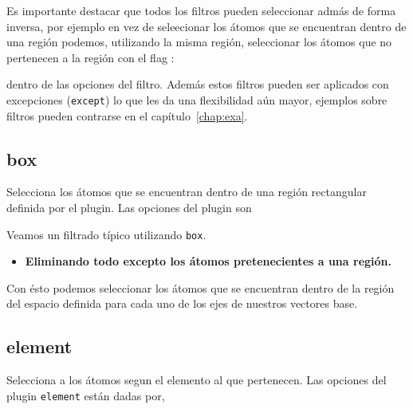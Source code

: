 Es importante destacar que todos los filtros pueden seleccionar adm\'as de forma inversa, por ejemplo en vez de seleecionar los \'atomos que se encuentran dentro de una regi\'on podemos, utilizando la misma regi\'on, seleccionar los \'atomos que no pertenecen a la regi\'on con el flag :


dentro de las opciones del filtro. Adem\'as estos filtros pueden ser aplicados con excepciones (\verb|except|) lo que les da una flexibilidad a\'un mayor, ejemplos sobre filtros pueden contrarse en el cap\'itulo~\ref{chap:exa}.

\subsection{box}
Selecciona los \'atomos que se encuentran dentro de una regi\'on rectangular definida por el plugin. Las opciones del plugin son


Veamos un filtrado t\'ipico utilizando \verb|box|.

\begin{itemize}
 \item \textbf{Eliminando todo excepto los \'atomos pretenecientes a una regi\'on.}
\end{itemize}

Con \'esto podemos seleccionar los \'atomos que se encuentran dentro de la regi\'on del espacio definida para cada uno de los ejes de nuestros vectores base.

\subsection{element}
Selecciona a los \'atomos segun el elemento al que pertenecen. Las opciones del plugin \verb|element| est\'an dadas por,


